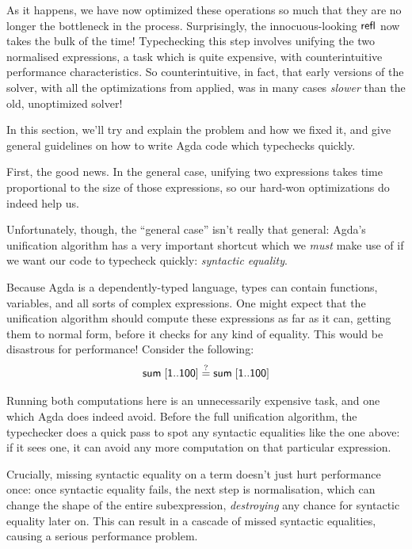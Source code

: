 \documentclass[acmsmall,review,anonymous]{acmart}\settopmatter{printfolios=true,printccs=false,printacmref=false}
\begin{document}
As it happens, we have now optimized these operations so much that they are no
longer the bottleneck in the process. Surprisingly, the innocuous-looking
\(\AgdaInductiveConstructor{refl}\) now takes the bulk of the time! Typechecking
this step involves unifying the two normalised expressions, a task which is
quite expensive, with counterintuitive performance characteristics. So
counterintuitive, in fact, that early versions of the solver, with all the
optimizations from \citet{gregoire_proving_2005} applied, was in many cases
\emph{slower} than the old, unoptimized solver!

In this section, we'll try and explain the problem and how we fixed it, and give
general guidelines on how to write Agda code which typechecks quickly.

First, the good news. In the general case, unifying two expressions takes time
proportional to the size of those expressions, so our hard-won optimizations do
indeed help us.

Unfortunately, though, the ``general case'' isn't really that general: Agda's
unification algorithm has a very important shortcut which we \emph{must} make
use of if we want our code to typecheck quickly: \emph{syntactic equality}.

Because Agda is a dependently-typed language, types can contain functions,
variables, and all sorts of complex expressions. One might expect that the
unification algorithm should compute these expressions as far as it can, getting
them to normal form, before it checks for any kind of equality. This would be
disastrous for performance! Consider the following:
\[ \AgdaFunction{sum} \; [ \AgdaNumber{1} .. \AgdaNumber{100} ] \stackrel{?}{=}
  \AgdaFunction{sum} \; [ \AgdaNumber{1} .. \AgdaNumber{100} ] \]

Running both computations here is an unnecessarily expensive task, and one which
Agda does indeed avoid. Before the full unification algorithm, the typechecker
does a quick pass to spot any syntactic equalities like the one above: if it
sees one, it can avoid any more computation on that particular expression.

Crucially, missing syntactic equality on a term doesn't just hurt performance
once: once syntactic equality fails, the next step is normalisation, which can
change the shape of the entire subexpression, \emph{destroying} any chance for
syntactic equality later on. This can result in a cascade of missed syntactic
equalities, causing a serious performance problem.
\end{document}
